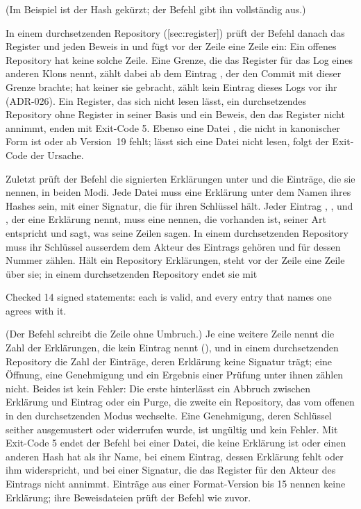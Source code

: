(Im Beispiel ist der Hash gekürzt; der Befehl gibt ihn vollständig aus.)

In einem durchsetzenden Repository ([sec:register]) prüft der Befehl danach das
Register und jeden Beweis in  und fügt vor der Zeile  eine
Zeile ein: 
Ein offenes Repository hat keine solche Zeile.
Eine Grenze, die das Register für das Log eines anderen Klons nennt, zählt dabei ab dem Eintrag
, der den Commit mit dieser Grenze brachte; hat keiner sie gebracht, zählt kein
Eintrag dieses Logs vor ihr (ADR-026).
Ein Register, das sich nicht lesen lässt, ein durchsetzendes Repository ohne Register in
seiner Basis und ein Beweis, den das Register nicht annimmt, enden mit Exit-Code 5.
Ebenso eine Datei , die nicht in kanonischer Form ist oder ab Version~19
fehlt; lässt sich eine Datei nicht lesen, folgt der Exit-Code der Ursache.

Zuletzt prüft der Befehl die signierten Erklärungen unter  und die
Einträge, die sie nennen, in beiden Modi.
Jede Datei muss eine Erklärung unter dem Namen ihres Hashes sein, mit einer Signatur, die für
ihren Schlüssel hält.
Jeder Eintrag , ,  und , der eine
Erklärung nennt, muss eine nennen, die vorhanden ist, seiner Art entspricht und sagt, was seine
Zeilen sagen.
In einem durchsetzenden Repository muss ihr Schlüssel ausserdem dem Akteur des Eintrags gehören
und für dessen Nummer zählen.
Hält ein Repository Erklärungen, steht vor der Zeile  eine Zeile über sie;
in einem durchsetzenden Repository endet sie mit

\starttyping
Checked 14 signed statements: each is valid, and every entry that names
  one agrees with it.
\stoptyping

(Der Befehl schreibt die Zeile ohne Umbruch.)
Je eine weitere Zeile nennt die Zahl der Erklärungen, die kein Eintrag nennt
(), und in einem durchsetzenden
Repository die Zahl der Einträge, deren Erklärung keine Signatur trägt; eine Öffnung, eine
Genehmigung und ein Ergebnis einer Prüfung unter ihnen zählen nicht.
Beides ist kein Fehler: Die erste hinterlässt ein Abbruch zwischen Erklärung und Eintrag oder
ein Purge, die zweite ein Repository, das vom offenen in den durchsetzenden Modus wechselte.
Eine Genehmigung, deren Schlüssel seither ausgemustert oder widerrufen wurde, ist ungültig und
kein Fehler.
Mit Exit-Code 5 endet der Befehl bei einer Datei, die keine Erklärung ist oder einen anderen
Hash hat als ihr Name, bei einem Eintrag, dessen Erklärung fehlt oder ihm widerspricht, und bei
einer Signatur, die das Register für den Akteur des Eintrags nicht annimmt.
Einträge aus einer Format-Version bis 15 nennen keine Erklärung; ihre Beweisdateien prüft der
Befehl wie zuvor.

